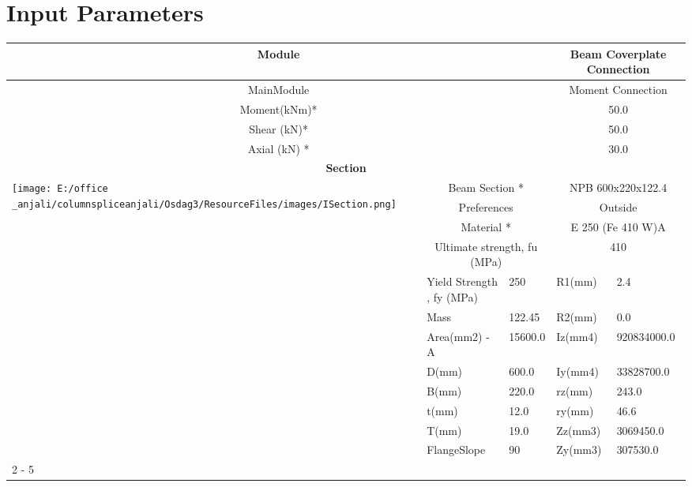 \documentclass{article}%
\begin{document}
%
\normalsize%
\pagestyle{header}%
\section{Input Parameters}%
\label{sec:InputParameters}%
\renewcommand{\arraystretch}{1.2}%
\begin{longtable}{|p{5cm}|p{2cm}|p{2cm}|p{2cm}|p{5cm}|}%
\hline%
\hline%
\multicolumn{3}{|c|}{Module}&\multicolumn{2}{|c|}{Beam Coverplate Connection}\\%
\hline%
\hline%
\multicolumn{3}{|c|}{MainModule}&\multicolumn{2}{|c|}{Moment Connection}\\%
\hline%
\hline%
\multicolumn{3}{|c|}{Moment(kNm)*}&\multicolumn{2}{|c|}{50.0}\\%
\hline%
\hline%
\multicolumn{3}{|c|}{Shear (kN)*}&\multicolumn{2}{|c|}{50.0}\\%
\hline%
\hline%
\multicolumn{3}{|c|}{Axial (kN) *}&\multicolumn{2}{|c|}{30.0}\\%
\hline%
\hline%
\multicolumn{5}{|c|}{\textbf{Section}}\\%
\hline%
\hline%
\multirow{12}{*}{\texttt{[image: E:/office \_anjali/columnspliceanjali/Osdag3/ResourceFiles/images/ISection.png]}}&\multicolumn{2}{|c|}{Beam Section *}&\multicolumn{2}{|c|}{NPB 600x220x122.4}\\%
\cline{2%
-%
5}%
&\multicolumn{2}{|c|}{Preferences}&\multicolumn{2}{|c|}{Outside}\\%
\cline{2%
-%
5}%
&\multicolumn{2}{|c|}{Material *}&\multicolumn{2}{|c|}{E 250 (Fe 410 W)A}\\%
\cline{2%
-%
5}%
&\multicolumn{2}{|c|}{Ultimate strength, fu (MPa)}&\multicolumn{2}{|c|}{410}\\%
\cline{2%
-%
5}%
&Yield Strength , fy (MPa)&250&R1(mm)&2.4\\%
\cline{2%
-%
5}%
&Mass&122.45&R2(mm)&0.0\\%
\cline{2%
-%
5}%
&Area(mm2) {-} A&15600.0&Iz(mm4)&920834000.0\\%
\cline{2%
-%
5}%
&D(mm)&600.0&Iy(mm4)&33828700.0\\%
\cline{2%
-%
5}%
&B(mm)&220.0&rz(mm)&243.0\\%
\cline{2%
-%
5}%
&t(mm)&12.0&ry(mm)&46.6\\%
\cline{2%
-%
5}%
&T(mm)&19.0&Zz(mm3)&3069450.0\\%
\cline{2%
-%
5}%
&FlangeSlope&90&Zy(mm3)&307530.0\\%
\cline{2%
-%
5}%
\hline%
\multicolumn{5}{|c|}{\textbf{Bolt Details}}\\%

\end{longtable}
\end{document}
